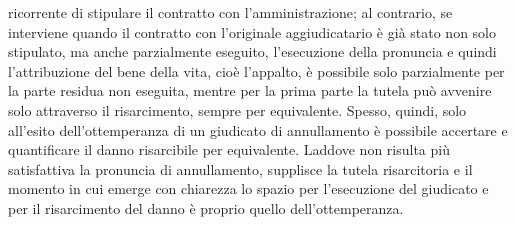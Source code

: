 \documentclass[12pt,it,a4paper,]{report}
\begin{document}
ricorrente di stipulare il contratto con l'amministrazione; al
contrario, se interviene quando il contratto con l'originale
aggiudicatario è già stato non solo stipulato, ma anche parzialmente
eseguito, l'esecuzione della pronuncia e quindi l'attribuzione del bene
della vita, cioè l'appalto, è possibile solo parzialmente per la parte
residua non eseguita, mentre per la prima parte la tutela può avvenire
solo attraverso il risarcimento, sempre per equivalente. Spesso, quindi,
solo all'esito dell'ottemperanza di un giudicato di annullamento è
possibile accertare e quantificare il danno risarcibile per equivalente.
Laddove non risulta più satisfattiva la pronuncia di annullamento,
supplisce la tutela risarcitoria e il momento in cui emerge con
chiarezza lo spazio per l'esecuzione del giudicato e per il risarcimento
del danno è proprio quello dell'ottemperanza.
\end{document}
